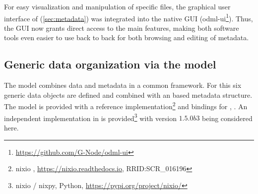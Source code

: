 For easy visualization and manipulation of specific  files, the graphical user interface of  (\cref{sec:metadata}) was integrated into the native  GUI (odml-ui\footnote{\url{https://github.com/G-Node/odml-ui}}). Thus, the  GUI now grants direct access to the main  features, making both software tools even easier to use back to back for both browsing and editing of metadata.


\subsection{Generic data organization via the  model}
The  model combines data and metadata in a common framework. For this six generic data objects are defined and combined with an  based metadata structure. The  model is provided with a  reference implementation\footnote{nixio , \url{https://nixio.readthedocs.io},  RRID:SCR\_016196} and bindings for , . An independent implementation in  is provided\footnote{nixio / nixpy, Python, \url{https://pypi.org/project/nixio/}} with version $1.5.0b3$ being considered here.

